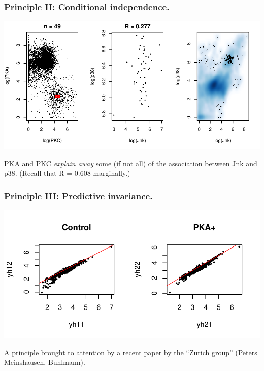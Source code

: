 \documentclass{beamer}
\begin{document}
\begin{frame}
\frametitle{Principle II: Conditional independence.}

\begin{center}
\includegraphics[scale = 0.7]{../images/plot03_04.pdf}
\end{center}

PKA and PKC \emph{explain away} some (if not all) of the association between Jnk and p38.
(Recall that R = 0.608 marginally.)

\end{frame}


\begin{frame}
\frametitle{Principle III: Predictive invariance.}

\begin{center}
\includegraphics[scale = 0.5]{../images/plot04_01.pdf}
\end{center}

A principle brought to attention by a recent paper by the ``Zurich group'' (Peters Meinshausen, Buhlmann).

\end{frame}
\end{document}
